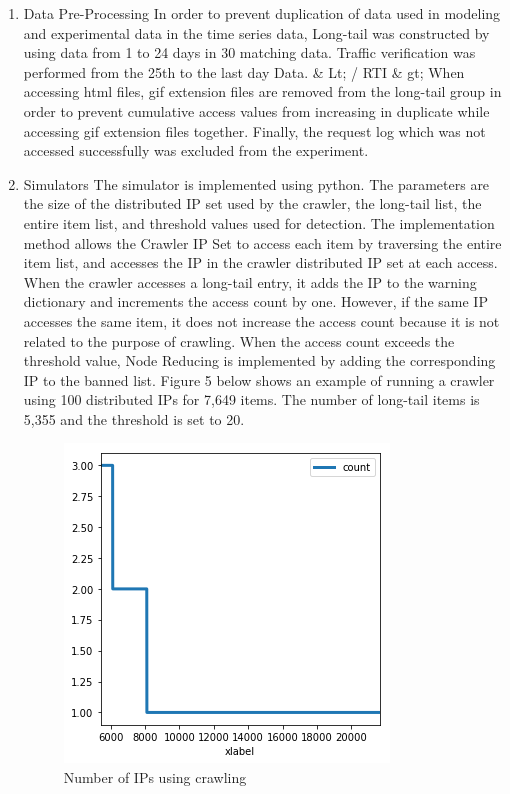 \documentclass[letterpaper, 10 pt, conference]{ieeeconf}
\begin{document}
\begin{enumerate}
\item Data Pre-Processing
\newline In order to prevent duplication of data used in modeling and experimental data in the time series data, Long-tail was constructed by using data from 1 to 24 days in 30 matching data. Traffic verification was performed from the 25th to the last day Data. \& Lt; / RTI \& gt;
When accessing html files, gif extension files are removed from the long-tail group in order to prevent cumulative access values from increasing in duplicate while accessing gif extension files together.
Finally, the request log which was not accessed successfully was excluded from the experiment.
\newline
\item Simulators
\newline 
The simulator is implemented using python. The parameters are the size of the distributed IP set used by the crawler, the long-tail list, the entire item list, and threshold values used for detection.
The implementation method allows the Crawler IP Set to access each item by traversing the entire item list, and accesses the IP in the crawler distributed IP set at each access.
When the crawler accesses a long-tail entry, it adds the IP to the warning dictionary and increments the access count by one. However, if the same IP accesses the same item, it does not increase the access count because it is not related to the purpose of crawling. When the access count exceeds the threshold value, Node Reducing is implemented by adding the corresponding IP to the banned list. Figure 5 below shows an example of running a crawler using 100 distributed IPs for 7,649 items. The number of long-tail items is 5,355 and the threshold is set to 20. 

\begin{figure}[H]
    \includegraphics[width=0.65\columnwidth]{figs/figure_05_td4.png}
    \caption{Number of IPs using crawling}
    \label{fig:my_label}
\end{figure}


\end{enumerate}
\end{document}
